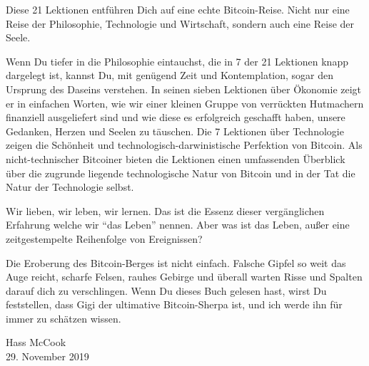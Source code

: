 Diese 21 Lektionen entführen Dich auf eine echte Bitcoin-Reise. Nicht nur eine
Reise der Philosophie, Technologie und Wirtschaft, sondern auch eine Reise der
Seele.

Wenn Du tiefer in die Philosophie eintauchst, die in 7 der 21 Lektionen knapp
dargelegt ist, kannst Du, mit genügend Zeit und Kontemplation, sogar den
Ursprung des Daseins verstehen. In seinen sieben Lektionen über Ökonomie zeigt
er in einfachen Worten, wie wir einer kleinen Gruppe von verrückten Hutmachern
finanziell ausgeliefert sind und wie diese es erfolgreich geschafft haben,
unsere Gedanken, Herzen und Seelen zu täuschen. Die 7 Lektionen über Technologie
zeigen die Schönheit und technologisch-darwinistische Perfektion von Bitcoin.
Als nicht-technischer Bitcoiner bieten die Lektionen einen umfassenden Überblick
über die zugrunde liegende technologische Natur von Bitcoin und in der Tat die
Natur der Technologie selbst.

Wir lieben, wir leben, wir lernen. Das ist die Essenz dieser vergänglichen
Erfahrung welche wir \enquote{das Leben} nennen. Aber was ist das Leben, außer
eine zeitgestempelte Reihenfolge von Ereignissen?

Die Eroberung des Bitcoin-Berges ist nicht einfach. Falsche Gipfel so weit das
Auge reicht, scharfe Felsen, rauhes Gebirge und überall warten Risse und Spalten
darauf dich zu verschlingen. Wenn Du dieses Buch gelesen hast, wirst Du
feststellen, dass Gigi der ultimative Bitcoin-Sherpa ist, und ich werde ihn für
immer zu schätzen wissen.

\begin{flushright}
  Hass McCook \\
  29. November 2019
\end{flushright}

